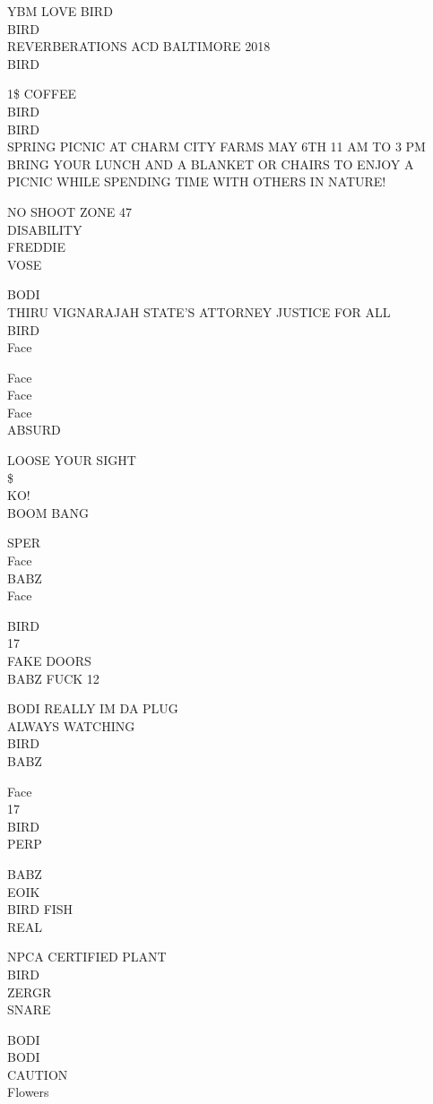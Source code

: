\documentclass[10pt,letterpaper]{article}
\begin{document}
YBM LOVE BIRD\\
BIRD\\
REVERBERATIONS ACD BALTIMORE 2018\\
BIRD

1\$ COFFEE\\
BIRD\\
BIRD\\
SPRING PICNIC AT CHARM CITY FARMS MAY 6TH 11 AM TO 3 PM BRING YOUR LUNCH AND A BLANKET OR CHAIRS TO ENJOY A PICNIC WHILE SPENDING TIME WITH OTHERS IN NATURE!

NO SHOOT ZONE 47\\
DISABILITY\\
FREDDIE\\
VOSE

BODI\\
THIRU VIGNARAJAH STATE'S ATTORNEY JUSTICE FOR ALL\\
BIRD\\
Face

Face\\
Face\\
Face\\
ABSURD

LOOSE YOUR SIGHT\\
\$\\
KO!\\
BOOM BANG

SPER\\
Face\\
BABZ\\
Face

BIRD\\
17\\
FAKE DOORS\\
BABZ FUCK 12

BODI REALLY IM DA PLUG\\
ALWAYS WATCHING\\
BIRD\\
BABZ

Face\\
17\\
BIRD\\
PERP

BABZ\\
EOIK\\
BIRD FISH\\
REAL

NPCA CERTIFIED PLANT\\
BIRD\\
ZERGR\\
SNARE

BODI\\
BODI\\
CAUTION\\
Flowers
\end{document}
